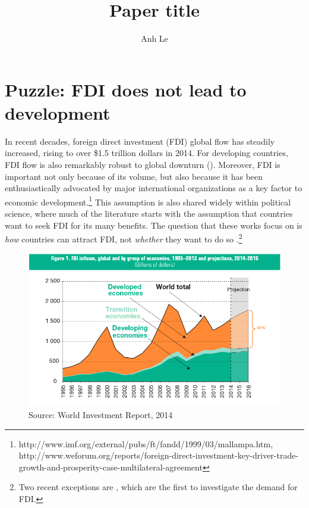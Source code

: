 \documentclass[12pt]{article}
\title{Paper title}
\author{Anh Le}
\begin{document}
\maketitle

\section{Puzzle: FDI does not lead to development}

In recent decades, foreign direct investment (FDI) global flow has steadily increased, rising to over \$1.5 trillion dollars in 2014. For developing countries, FDI flow is also remarkably robust to global downturn (). Moreover, FDI is important not only because of its volume, but also because it has been enthusiastically advocated by major international organizations as a key factor to economic development.\footnote{http://www.imf.org/external/pubs/ft/fandd/1999/03/mallampa.htm, http://www.weforum.org/reports/foreign-direct-investment-key-driver-trade-growth-and-prosperity-case-multilateral-agreement} This assumption is also shared widely within political science, where much of the literature starts with the assumption that countries want to seek FDI for its many benefits. The question that these works focus on is \textit{how} countries can attract FDI, not \textit{whether} they want to do so \citep{Jensen2003, Li2003, Li2006, Ahlquist2006}.\footnote{Two recent exceptions are \citet{Pinto2013, Pandya2013}, which are the first to investigate the demand for FDI.} 

\begin{figure}[!ht]
\includegraphics[width=\textwidth, height=\textheight,keepaspectratio]{../figure/global_fdi}
\caption{Source: World Investment Report, 2014}
\label{fig:globalfdi}
\end{figure}
\end{document}
